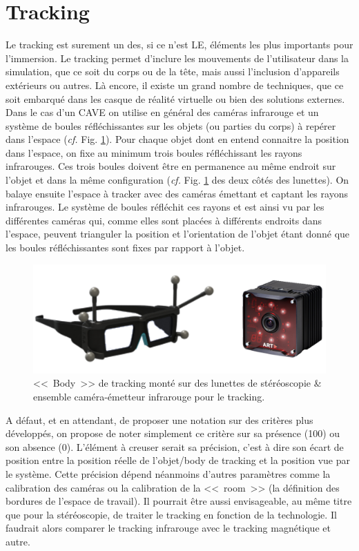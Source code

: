 	\section{Tracking}
	\par Le tracking est surement un des, si ce n'est LE, éléments les plus importants pour l'immersion. Le tracking permet d'inclure les mouvements de l'utilisateur dans la simulation, que ce soit du corps ou de la tête, mais aussi l'inclusion d'appareils extérieurs ou autres. Là encore, il existe un grand nombre de techniques, que ce soit embarqué dans les casque de réalité virtuelle ou bien des solutions externes. Dans le cas d'un CAVE on utilise en général des caméras infrarouge et un système de boules réfléchissantes sur les objets (ou parties du corps) à repérer dans l'espace (\textit{cf.} Fig. \ref{fig:tracking_illustration}). Pour chaque objet dont en entend connaitre la position dans l'espace, on fixe au minimum trois boules réfléchissant les rayons infrarouges. Ces trois boules doivent être en permanence au même endroit sur l'objet et dans la même configuration (\textit{cf.} Fig. \ref{fig:tracking_illustration} des deux côtés des lunettes). On balaye ensuite l'espace à tracker avec des caméras émettant et captant les rayons infrarouges. Le système de boules réfléchit ces rayons et est ainsi vu par les différentes caméras qui, comme elles sont placées à différents endroits dans l'espace, peuvent trianguler la position et l'orientation de l'objet étant donné que les boules réfléchissantes sont fixes par rapport à l'objet.
	
	\begin{figure}
		\centering
		\includegraphics[scale=.6]{Figures/TrackingCameraBody}
		\caption{<<~Body~>> de tracking monté sur des lunettes de stéréoscopie \& ensemble caméra-émetteur infrarouge pour le tracking.}
		\label{fig:tracking_illustration}
	\end{figure}
	
	\par A défaut, et en attendant, de proposer une notation sur des critères plus développés, on propose de noter simplement ce critère sur sa présence (100) ou son absence (0). L'élément à creuser serait sa précision, c'est à dire son écart de position entre la position réelle de l'objet/body de tracking et la position vue par le système. Cette précision dépend néanmoins d'autres paramètres comme la calibration des caméras ou la calibration de la <<~room~>> (la définition des bordures de l'espace de travail). Il pourrait être aussi envisageable, au même titre que pour la stéréoscopie, de traiter le tracking en fonction de la technologie. Il faudrait alors comparer le tracking infrarouge avec le tracking magnétique et autre.
		
